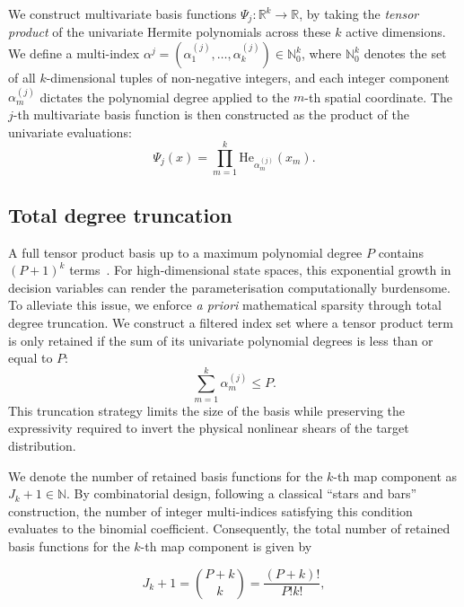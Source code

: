 We construct multivariate basis functions $\Psi_j : \mathbb{R}^k \rightarrow \mathbb{R}$, by taking the \emph{tensor product} of the univariate Hermite polynomials across these $k$ active dimensions. We define a multi-index $\alpha^{j} = (\alpha_1^{(j)}, \dots, \alpha_k^{(j)}) \in \mathbb{N}_0^k$, where $\mathbb{N}_0^k$ denotes the set of all $k$-dimensional tuples of non-negative integers, and each integer component $\alpha_m^{(j)}$ dictates the polynomial degree applied to the $m$-th spatial coordinate. The $j$-th multivariate basis function is then constructed as the product of the univariate evaluations:
\begin{equation*}
    \Psi_j(x) = \prod_{m=1}^k \mathrm{He}_{\alpha_m^{(j)}}(x_m).
    \label{eq:tensor_product_basis}
\end{equation*}

\subsection{Total degree truncation} \label{subsec:total_defree truncation}

A full tensor product basis up to a maximum polynomial degree $P$ contains $(P+1)^k$ terms~\cite{Baptista2022}. For high-dimensional state spaces, this exponential growth in decision variables can render the parameterisation computationally burdensome. To alleviate this issue, we enforce \emph{a priori} mathematical sparsity through total degree truncation. We construct a filtered index set where a tensor product term is only retained if the sum of its univariate polynomial degrees is less than or equal to $P$:
\begin{equation*}
    \sum_{m=1}^k \alpha_m^{(j)} \le P.
    \label{eq:total_degree_truncation}
\end{equation*}
This truncation strategy limits the size of the basis while preserving the expressivity required to invert the physical nonlinear shears of the target distribution.

We denote the number of retained basis functions for the $k$-th map component as $J_k + 1 \in \mathbb{N}$. By combinatorial design, following a classical ``stars and bars'' construction, the number of integer multi-indices satisfying this condition evaluates to the binomial coefficient. Consequently, the total number of retained basis functions for the $k$-th map component is given by

\begin{equation*}
    J_k + 1 = \binom{P + k}{k} = \frac{(P+k)!}{P!k!},
\end{equation*}

